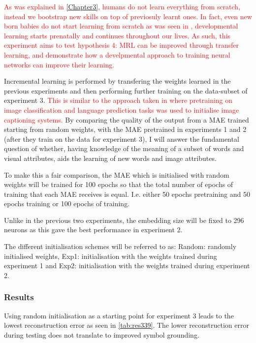 \textcolor{red}{As was explained in \autoref{Chapter3}, humans do not learn everything from scratch, instead we bootstrap new skills on top of previosuly learnt ones. In fact, even new born babies do not start learning from scratch as was seen in \cite{webb2015mother, fantz1963pattern, reid2017human}, developmental learning starts prenatally and continues throughout our lives. As such, this experiment aims to test hypothesis 4: \ac{MRL} can be improved through transfer learning, and demonstrate how a develpmental approach to training neural networks can improve their learning.}

Incremental learning is performed by transfering the weights learned in the previous experiments and then performing further training on the data-subset of experiment 3. \textcolor{red}{This is similar to the approach taken in \cite{vinyals2015show, venugopalan2014translating, johnson2016densecap} where pretraining on image classification and language prediction tasks was used to initialise image captioning systems.} By comparing the quality of the output from a \ac{MAE} trained starting from random weights, with the \ac{MAE} pretrained in experiments 1 and 2 (after they train on the data for experiment 3), I will answer the fundamental question of whether, having knowledge of the meaning of a subset of words and visual attributes, aids the learning of new words and image attributes.

To make this a fair comparison, the MAE which is initialised with random weights will be trained for 100 epochs so that the total number of epochs of training that each \ac{MAE} receives is equal. I.e. either 50 epochs pretraining and 50 epochs training or 100 epochs of training.

Unlike in the previous two experiments, the embedding size will be fixed to 296 neurons as this gave the best performance in experiment 2.

The different initialisation schemes will be referred to as: Random: randomly initialised weights, Exp1: initialisation with the weights trained during experiment 1 and Exp2: initialisation with the weights trained during experiment 2.

\subsubsection{Results}
Using random initialisation as a starting point for experiment 3 leads to the lowest reconstruction error as seen in \autoref{tab:res339}. The lower reconstruction error during testing does not translate to improved symbol grounding.


